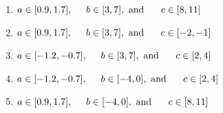 \documentclass[14pt]{extbook}
\begin{document}
\begin{enumerate}
{\begin{center}
\end{center}
\begin{enumerate}[label=\Alph*.]
\item \( a \in [0.9, 1.7], \hspace*{5mm} b \in [3, 7], \text{ and } \hspace*{5mm} c \in [8, 11] \)
\item \( a \in [0.9, 1.7], \hspace*{5mm} b \in [3, 7], \text{ and } \hspace*{5mm} c \in [-2, -1] \)
\item \( a \in [-1.2, -0.7], \hspace*{5mm} b \in [3, 7], \text{ and } \hspace*{5mm} c \in [2, 4] \)
\item \( a \in [-1.2, -0.7], \hspace*{5mm} b \in [-4, 0], \text{ and } \hspace*{5mm} c \in [2, 4] \)
\item \( a \in [0.9, 1.7], \hspace*{5mm} b \in [-4, 0], \text{ and } \hspace*{5mm} c \in [8, 11] \)


\end{enumerate}}
\end{enumerate}
\end{document}
